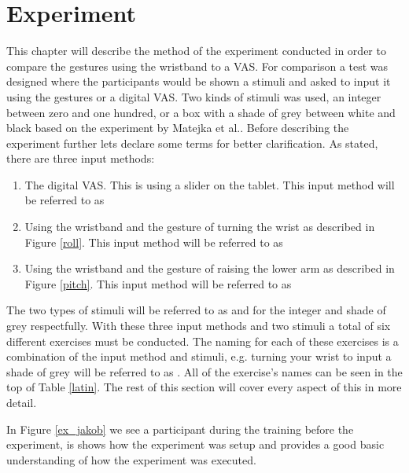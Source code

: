 \chapter{Experiment}\label{eks_ch}

This chapter will describe the method of the experiment conducted in order to compare the gestures using the wristband to a VAS. For comparison a test was designed where the participants would be shown a stimuli and asked to input it using the gestures or a digital VAS. Two kinds of stimuli was used, an integer between zero and one hundred, or a box with a shade of grey between white and black based on the experiment by Matejka et al.\cite{grey}. Before describing the experiment further lets declare some terms for better clarification. As stated, there are three input methods:

\begin{enumerate}
\item The digital VAS. This is using a slider on the tablet. This input method will be referred to as 
\item Using the wristband and the gesture of turning the wrist as described in Figure \ref{roll}. This input method will be referred to as 
\item Using the wristband and the gesture of raising the lower arm as described in Figure \ref{pitch}. This input method will be referred to as 
\end{enumerate}

The two types of stimuli will be referred to as  and  for the integer and shade of grey respectfully. With these three input methods and two stimuli a total of six different exercises must be conducted. The naming for each of these exercises is a combination of the input method and stimuli, e.g. turning your wrist to input a shade of grey will be referred to as . All of the exercise's names can be seen in the top of Table \ref{latin}. The rest of this section will cover every aspect of this in more detail.

In Figure \ref{ex_jakob} we see a participant during the training before the experiment, is shows how the experiment was setup and provides a good basic understanding of how the experiment was executed.

